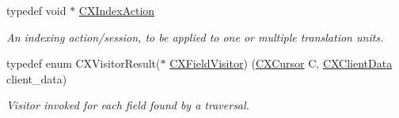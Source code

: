 \begin{DoxyCompactItemize}
\mbox{\label{group__CINDEX__HIGH_gac8d30d3e3fb34d887b611e7c6de3afb6}} 
typedef void $\ast$ \hyperlink{group__CINDEX__HIGH_gac8d30d3e3fb34d887b611e7c6de3afb6}{C\+X\+Index\+Action}
\begin{DoxyCompactList}\small\item\em An indexing action/session, to be applied to one or multiple translation units. \end{DoxyCompactList}\item 
typedef enum C\+X\+Visitor\+Result($\ast$ \hyperlink{group__CINDEX__HIGH_ga5040863c91d7a720a97569cf869f42a4}{C\+X\+Field\+Visitor}) (\hyperlink{structCXCursor}{C\+X\+Cursor} C, \hyperlink{group__CINDEX_gacfa40c3de26d228c0d898403c2c21612}{C\+X\+Client\+Data} client\+\_\+data)
\begin{DoxyCompactList}\small\item\em Visitor invoked for each field found by a traversal. \end{DoxyCompactList}\end{DoxyCompactItemize}
